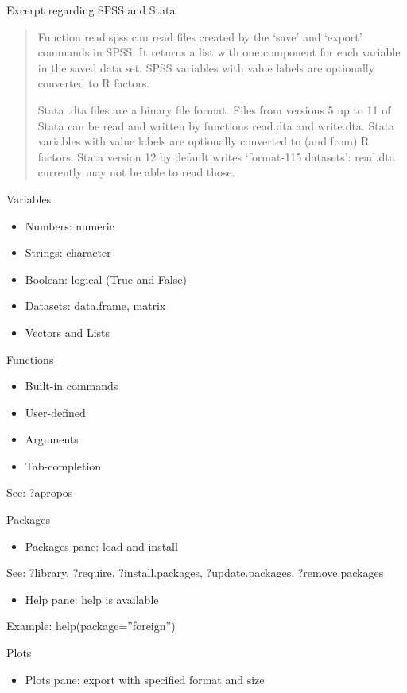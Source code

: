 \documentclass{beamer}
\begin{document}
\begin{frame}{Excerpt regarding SPSS and Stata}

\begin{quotation}
Function read.spss can read files created by the ‘save’ and ‘export’ commands in SPSS.
It returns a list with one component for each variable in the saved data set.
SPSS variables with value labels are optionally converted to R factors.

Stata .dta files are a binary file format.
Files from versions 5 up to 11 of Stata can be read and written by functions read.dta and write.dta.
Stata variables with value labels are optionally converted to (and from) R factors.
Stata version 12 by default writes ‘format-115 datasets’: read.dta currently may not be able to read those.
\end{quotation}

\end{frame}

\begin{frame}{Variables}

\begin{itemize}
\item Numbers: numeric
\item Strings: character
\item Boolean: logical (True and False)
\item Datasets: data.frame, matrix
\item Vectors and Lists
\end{itemize}

\end{frame}

\begin{frame}{Functions}

\begin{itemize}
\item Built-in commands
\item User-defined
\item Arguments
\item Tab-completion
\end{itemize}

See: ?apropos

\end{frame}

\begin{frame}{Packages}

\begin{itemize}
\item Packages pane: load and install
\end{itemize}

See: ?library, ?require, ?install.packages, ?update.packages, ?remove.packages

\begin{itemize}
\item Help pane: help is available
\end{itemize}

Example: help(package=''foreign'')

\end{frame}

\begin{frame}{Plots}

\begin{itemize}
\item Plots pane: export with specified format and size
\end{itemize}

\end{frame}
\end{document}

